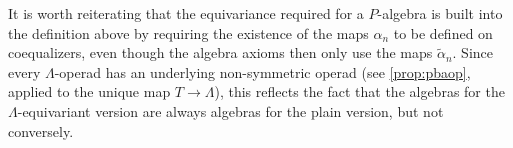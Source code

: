 %
%
%

\begin{rem}
It is worth reiterating that the equivariance required for a $P$-algebra is built into the definition above by requiring the existence of the maps $\alpha_{n}$ to be defined on coequalizers, even though the algebra axioms then only use the maps $\tilde{\alpha}_{n}$. Since every $\Lambda$-operad has an underlying non-symmetric operad (see \cref{prop:pbaop}, applied to the unique map $T \rightarrow \Lambda$), this reflects the fact that the algebras for the $\Lambda$-equivariant version are always algebras for the plain version, but not conversely.
\end{rem}

